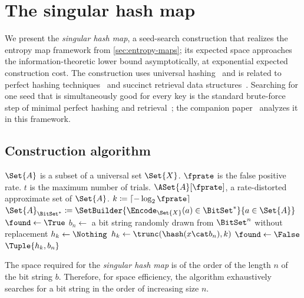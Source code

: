 \documentclass[ ../main.tex]{subfiles}
\begin{document}
\section{The singular hash map}
\label{sec:shm}

We present the \emph{singular hash map}, a seed-search construction that realizes the entropy map framework from \cref{sec:entropy-maps}; its expected space approaches the information-theoretic lower bound asymptotically, at exponential expected construction cost.
The construction uses universal hashing~\cite{carterWegman1979} and is related to perfect hashing techniques~\cite{fredmanKomlosSzemeredi1984} and succinct retrieval data structures~\cite{dietzfelbinger2008}.
Searching for one seed that is simultaneously good for every key is the standard brute-force step of minimal perfect hashing and retrieval~\cite{esposito2020recsplit,lehmann2025seeds}; the companion paper~\cite{bhf} analyzes it in this framework.

\subsection{Construction algorithm}
\label{sec:shm-construction}

\begin{algorithm}
	\caption{Implementation of \protect\MakeSingularHashMap over a universal set $\Set{X}$}
	\label{alg:makeset}
	\DontPrintSemicolon
	\KwIn
	{
		$\Set{A}$ is a subset of a universal set $\Set{X}$.
		$\fprate$ is the false positive rate.
		$t$ is the maximum number of trials.
	}
	\KwOut
	{
		$\ASet{A}[\fprate]$, a rate-distorted approximate set of $\Set{A}$.
	}
	{
		$k \coloneqq \lceil -\log_2 \fprate \rceil$\;
		$\Set{A}_{\BitSet^*} \coloneqq \SetBuilder{\Encode_{\Set{X}}(a) \in \BitSet^*}{a \in \Set{A}}$\;
		{
			{
				$\found \gets \True$\;
				$b_n \gets $ a bit string randomly drawn from $\BitSet^n$ without replacement\;
				$h_k \gets \Nothing$\;
				{
					{
						$h_k \gets \trunc(\hash(x \cat b_n), k)$\;
					}
					{
						$\found \gets \False$\;
					}
				}
				\If{\found}
				{
					\Return $\Tuple{h_k, b_n}$\;
				}
			}
		}
	}
\end{algorithm}

The space required for the \emph{singular hash map} is of the order of the length $n$ of the bit string $b$. Therefore, for space efficiency, the algorithm exhaustively searches for a bit string in the order of increasing size $n$.
\end{document}
